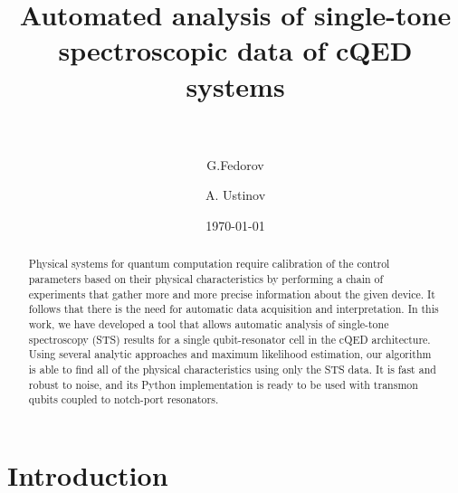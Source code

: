 \documentclass[%
 aip,
 draft,
 amsmath,amssymb,
 reprint,%
]{revtex4-1}
\begin{document}

\title[Automated analysis of single-tone spectroscopic data of cQED systems]{Automated analysis of single-tone spectroscopic data of cQED systems\\~}

\author{G.Fedorov}

%
%

\author{A. Ustinov}
%
%

\date{\today}%

\begin{abstract}
Physical systems for quantum computation require calibration of the control parameters based on their physical characteristics by performing a chain of experiments that gather more and more precise information about the given device. It follows that there is the need for automatic data acquisition and interpretation. In this work, we have developed a tool that allows automatic analysis of single-tone spectroscopy (STS) results for a single qubit-resonator cell in the cQED architecture. Using several analytic approaches and maximum likelihood estimation, our algorithm is able to find all of the physical characteristics using only the STS data. It is fast and robust to noise, and its Python implementation is ready to be used with transmon qubits coupled to notch-port resonators.
\end{abstract}

\maketitle

 \renewcommand*{\figureautorefname}{Fig.}

\section{Introduction} \label{sec:level1} 
\end{document}
